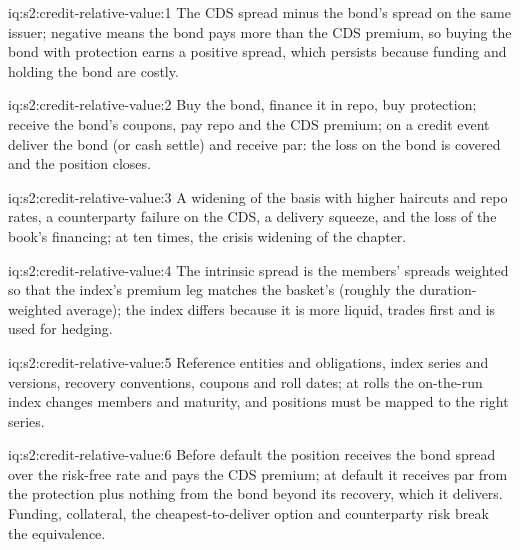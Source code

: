 \begin{solution}{iq:s2:credit-relative-value:1}
The CDS spread minus the bond's spread on the same issuer; negative means the bond pays more than the CDS premium, so buying the bond with protection
earns a positive spread, which persists because funding and holding the bond are costly.
\end{solution}

\begin{solution}{iq:s2:credit-relative-value:2}
Buy the bond, finance it in repo, buy protection; receive the bond's coupons, pay repo and the CDS premium; on a credit event deliver the bond (or cash
settle) and receive par: the loss on the bond is covered and the position closes.
\end{solution}

\begin{solution}{iq:s2:credit-relative-value:3}
A widening of the basis with higher haircuts and repo rates, a counterparty failure on the CDS, a delivery squeeze, and the loss of the book's
financing; at ten times, the crisis widening of the chapter.
\end{solution}

\begin{solution}{iq:s2:credit-relative-value:4}
The intrinsic spread is the members' spreads weighted so that the index's premium leg matches the basket's (roughly the duration-weighted average);
the index differs because it is more liquid, trades first and is used for hedging.
\end{solution}

\begin{solution}{iq:s2:credit-relative-value:5}
Reference entities and obligations, index series and versions, recovery conventions, coupons and roll dates; at rolls the on-the-run index changes
members and maturity, and positions must be mapped to the right series.
\end{solution}

\begin{solution}{iq:s2:credit-relative-value:6}
Before default the position receives the bond spread over the risk-free rate and pays the CDS premium; at default it receives par from the protection
plus nothing from the bond beyond its recovery, which it delivers. Funding, collateral, the cheapest-to-deliver option and counterparty risk break the
equivalence.
\end{solution}

